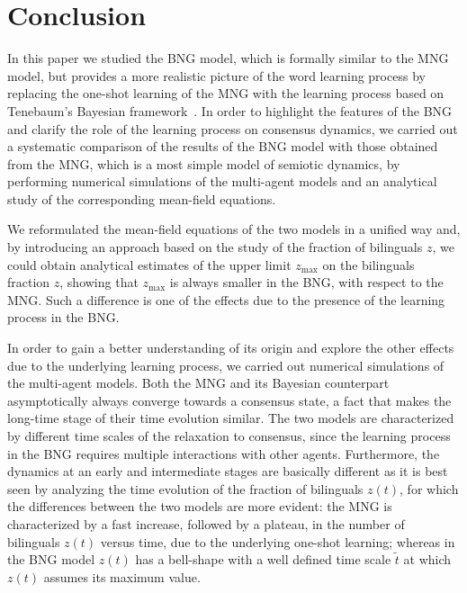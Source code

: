 \documentclass[review]{elsarticle}
\newcommand{\zmax}{z_\mathrm{max}}
\newcommand{\+}{\! + \!}
\begin{document}


\section{Conclusion} 
\label{sec:conclusion}


In this paper we studied the BNG model, which is formally similar to the MNG model, but provides a more realistic picture of the word learning process by replacing the one-shot learning of the MNG with the learning process based on Tenebaum's Bayesian framework~\cite{Tenenbaum-1999,Perfors-2011a}.
In order to highlight the features of the BNG and clarify the role of the learning process on consensus dynamics, we carried out a systematic comparison of the results of the BNG model with those obtained from the MNG, which is a most simple model of semiotic dynamics, by performing numerical simulations of the multi-agent models and an analytical study of the corresponding mean-field equations.


We reformulated the mean-field equations of the two models in a unified way and, by introducing an approach based on the study of the fraction of bilinguals $z$, we could obtain analytical estimates of the upper limit $\zmax$ on the bilinguals fraction $z$, showing that $\zmax$ is always smaller in the BNG, with respect to the MNG.
Such a difference is one of the effects due to the presence of the learning process in the BNG.


In order to gain a better understanding of its origin and explore the other effects due to the underlying learning process, we carried out numerical simulations of the multi-agent models.
Both the MNG and its Bayesian counterpart asymptotically always converge towards a consensus state, a fact that makes the long-time stage of their time evolution similar.
The two models are characterized by different time scales of the relaxation to consensus, since the learning process in the BNG requires multiple interactions with other agents.
Furthermore, the dynamics at an early and intermediate stages are basically different as it is best seen by analyzing the time evolution of the fraction of bilinguals $z(t)$, for which the differences between the two models are more evident:
the MNG is characterized by a fast increase, followed by a plateau, in the number of bilinguals $z(t)$ versus time, due to the underlying one-shot learning; whereas in the BNG model $z(t)$ has a bell-shape with a well defined time scale $\tilde{t}$ at which $z(t)$ assumes its maximum value. 
\end{document}
